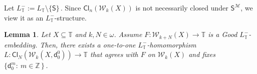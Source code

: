 \documentclass[10pt,a4paper, openany,  oldfontcommands]{memoir}
\newtheorem{lemma} [theorem] {Lemma}
\newtheorem{open problem} [theorem] {Open Problem}
\newtheorem{open question} [theorem] {Open Question}
\renewcommand{\mathrm}{\mathsf}
\begin{document}
Let   $  L_{  \mathbb{T} }^-   :=     L_{  \mathbb{T} }    \setminus  \lbrace  \mathrm{S} \rbrace    \,   $. 
Since   $  \mathsf{Cl}_{n}  \left(  \mathcal{W}_{k}  \left( X  \right)   \right)     $  is not necessarily closed under  
$  \mathrm{S}^{  \mathcal{M}  }  $, 
we  view it as  an     $  L_{  \mathbb{T} }^-  $-structure. 





\begin{lemma}   \label{SectionQNthClureLemma}
Let  $X \subseteq   \mathbb{T} $  and   $  k, N  \in  \omega $. 
Assume    $  F :  \mathcal{W}_{ k + N  }  \left(  X  \right)   \to   \mathbb{T}    $  is  a  \textsf{Good}  $  L_{  \mathbb{T} }^- $-embedding.
Then,  there  exists  a   one-to-one  $  L_{  \mathbb{T} }^-$-homomorphism   
 $  L:   \mathsf{Cl}_{N}  \left(  \mathcal{W}_{k}  \left( X  ,  \mathsf{d}^0_0 \right)   \right)   \to   \mathbb{T}   $
that agrees with  $  F  $  on     $  \mathcal{W}_{ k   }  \left(  X  \right)    $
and  fixes    $  \big\{   \mathsf{d}^m_0  :   \    m  \in  \mathbb{Z}   \,   \big\}     \,    $.
\end{lemma}
\end{document}
